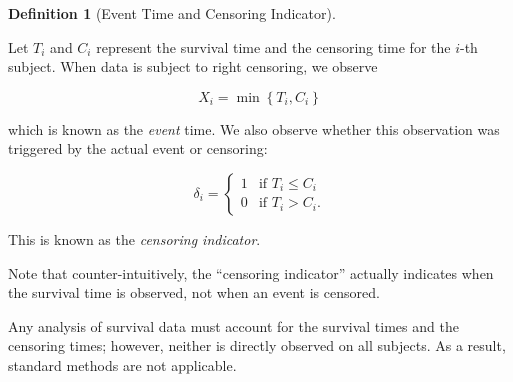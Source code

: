 \documentclass[
  letterpaper,
  DIV=11,
  numbers=noendperiod]{scrreprt}
\theoremstyle{definition}
\newtheorem{definition}{Definition}[chapter]
\theoremstyle{definition}
\theoremstyle{remark}
\begin{document}
\begin{definition}[Event Time and Censoring
Indicator]\protect\hypertarget{def-event-time}{}\label{def-event-time}

Let \(T_i\) and \(C_i\) represent the survival time and the censoring
time for the \(i\)-th subject. When data is subject to right censoring,
we observe

\[X_i = \min\left\{T_i, C_i\right\}\]

which is known as the \emph{event} time. We also observe whether this
observation was triggered by the actual event or censoring:

\[\delta_i = \begin{cases} 1 & \text{if } T_i \leq C_i \\ 0 & \text{if } T_i > C_i. \end{cases}\]

This is known as the \emph{censoring indicator}.

\end{definition}

\begin{tcolorbox}[enhanced jigsaw, left=2mm, toprule=.15mm, arc=.35mm, breakable, opacitybacktitle=0.6, opacityback=0, rightrule=.15mm, colbacktitle=quarto-callout-warning-color!10!white, coltitle=black, leftrule=.75mm, toptitle=1mm, colframe=quarto-callout-warning-color-frame, titlerule=0mm, title=\textcolor{quarto-callout-warning-color}{\faExclamationTriangle}\hspace{0.5em}{Warning}, bottomrule=.15mm, colback=white, bottomtitle=1mm]

Note that counter-intuitively, the ``censoring indicator'' actually
indicates when the survival time is observed, not when an event is
censored.

\end{tcolorbox}

\begin{tcolorbox}[enhanced jigsaw, left=2mm, toprule=.15mm, arc=.35mm, breakable, opacitybacktitle=0.6, opacityback=0, rightrule=.15mm, colbacktitle=quarto-callout-tip-color!10!white, coltitle=black, leftrule=.75mm, toptitle=1mm, colframe=quarto-callout-tip-color-frame, titlerule=0mm, title=\textcolor{quarto-callout-tip-color}{\faLightbulb}\hspace{0.5em}{Big Idea}, bottomrule=.15mm, colback=white, bottomtitle=1mm]

Any analysis of survival data must account for the survival times and
the censoring times; however, neither is directly observed on all
subjects. As a result, standard methods are not applicable.

\end{tcolorbox}
\end{document}
